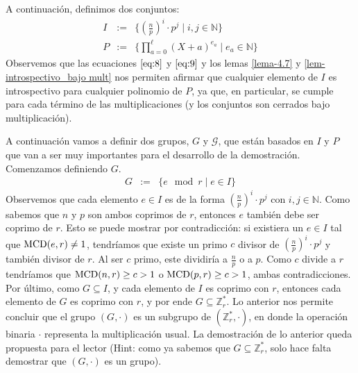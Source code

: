 \documentclass[10pt]{article}
\newcommand{\0}{\mathbf{0}}
\newcommand{\1}{\mathbf{1}}
\newcommand{\modl}{\mod}
\newcommand{\MCD}{{\rm MCD}}
\newcommand{\+}{\oplus}
\newcommand{\comentarior}[1]{}
\theoremstyle{remark}
\theoremstyle{remark}
\newcommand{\tq}{\mid}
\begin{document}
	\comentarior{Marcelo: hasta aquí revisé} 
	A continuación, definimos dos conjuntos:
	\begin{eqnarray}
		I&:=&\{(\frac{n}{p})^i\cdot p^j \tq i,j\in \mathbb{N}\}\nonumber\\
		P&:=&\{\prod_{a=0}^{\ell }(X+a)^{e_a}\tq e_a\in \mathbb{N}\}\nonumber	
	\end{eqnarray}
	Observemos que las ecuaciones $\eqref{eq:8}$ y $\eqref{eq:9}$ y los lemas \ref{lema-4.7} y \ref{lem-introspectivo_bajo mult} nos permiten afirmar que cualquier elemento de $I$ es introspectivo para cualquier polinomio de $P$, ya que, en particular, se cumple para cada término de las multiplicaciones (y los conjuntos son cerrados bajo multiplicación).
	
	A continuación vamos a definir dos grupos, $G$ y $\mathcal{G}$, que están basados en $I$ y $P$ que van a ser muy importantes para el desarrollo de la demostración. Comenzamos definiendo $G$.
		\begin{eqnarray}
			G&:=& \{e\modl r\tq e\in I\}\nonumber
		\end{eqnarray}
	Observemos que cada elemento $e\in I$ es de la forma $(\frac{n}{p})^i\cdot p^j$ con $i,j\in \mathbb{N}$. Como sabemos que $n$ y $p$ son ambos coprimos de $r$, entonces $e$ también debe ser coprimo de $r$.
	Esto se puede mostrar por contradicción: si existiera un $e\in I$ tal que $\MCD(e,r)\neq 1$, tendrí­amos que existe un primo $c$ divisor de $(\frac{n}{p})^i\cdot p^j$ y también divisor de $r$. Al ser $c$ primo, este dividiría a $\frac{n}{p}$ o a $p$. Como $c$ divide a $r$ tendríamos que $\MCD(n,r)\geq c>1$ o $\MCD(p,r)\geq c>1$, ambas contradicciones.
	 Por último, como $G\subseteq I$, y cada elemento de $I$ es coprimo con $r$, entonces cada elemento de $G$ es coprimo con $r$, y por ende $G\subseteq \mathbb{Z}_r^*$. Lo anterior nos permite concluir que el grupo $(G,\cdot)$ es un subgrupo de $(\mathbb{Z}_r^*,\cdot)$, en donde la operación binaria $\cdot$ representa la multiplicación usual. La demostración de lo anterior queda propuesta para el lector (Hint: como ya sabemos que $G\subseteq \mathbb{Z}_r^*$, solo hace falta demostrar que $(G,\cdot)$ es un grupo).	
\end{document}
